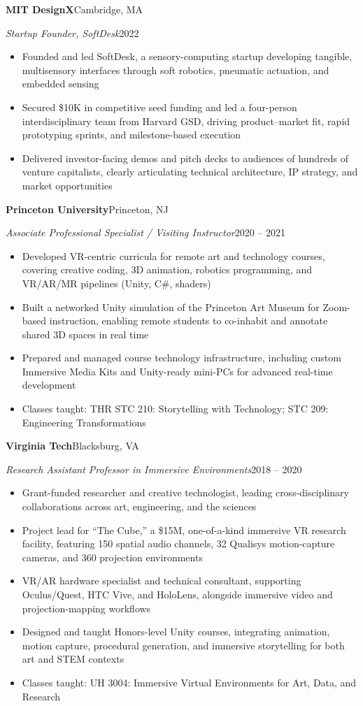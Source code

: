 \documentclass[10pt,letterpaper]{article}
\newcommand{\entry}[4]{%
  \par\addvspace{2.5pt}%
  {\large\bfseries #1}\hfill #2\par\nobreak
  \textit{#3}\hfill #4\par\nobreak}
\newenvironment{bullets}{%
  \begin{itemize}[leftmargin=0.95em,labelsep=0.35em,itemsep=0pt,parsep=0pt,topsep=1pt,partopsep=0pt,
    label={\raisebox{0.25ex}{\tiny$\bullet$}}]}{\end{itemize}}
\begin{document}
\entry{MIT DesignX}{Cambridge, MA}{Startup Founder, SoftDesk}{2022}
\begin{bullets}
\item Founded and led SoftDesk, a sensory-computing startup developing tangible, multisensory interfaces through soft robotics, pneumatic actuation, and embedded sensing
\item Secured \$10K in competitive seed funding and led a four-person interdisciplinary team from Harvard GSD, driving product--market fit, rapid prototyping sprints, and milestone-based execution
\item Delivered investor-facing demos and pitch decks to audiences of hundreds of venture capitalists, clearly articulating technical architecture, IP strategy, and market opportunities
\end{bullets}

\entry{Princeton University}{Princeton, NJ}{Associate Professional Specialist / Visiting Instructor}{2020 -- 2021}
\begin{bullets}
\item Developed VR-centric curricula for remote art and technology courses, covering creative coding, 3D animation, robotics programming, and VR/AR/MR pipelines (Unity, C\#, shaders)
\item Built a networked Unity simulation of the Princeton Art Museum for Zoom-based instruction, enabling remote students to co-inhabit and annotate shared 3D spaces in real time
\item Prepared and managed course technology infrastructure, including custom Immersive Media Kits and Unity-ready mini-PCs for advanced real-time development
\item Classes taught: THR STC 210: Storytelling with Technology; STC 209: Engineering Transformations
\end{bullets}

\entry{Virginia Tech}{Blacksburg, VA}{Research Assistant Professor in Immersive Environments}{2018 -- 2020}
\begin{bullets}
\item Grant-funded researcher and creative technologist, leading cross-disciplinary collaborations across art, engineering, and the sciences
\item Project lead for ``The Cube,'' a \$15M, one-of-a-kind immersive VR research facility, featuring 150 spatial audio channels, 32 Qualisys motion-capture cameras, and 360\textdegree{} projection environments
\item VR/AR hardware specialist and technical consultant, supporting Oculus/Quest, HTC Vive, and HoloLens, alongside immersive video and projection-mapping workflows
\item Designed and taught Honors-level Unity courses, integrating animation, motion capture, procedural generation, and immersive storytelling for both art and STEM contexts
\item Classes taught: UH 3004: Immersive Virtual Environments for Art, Data, and Research
\end{bullets}
\end{document}
